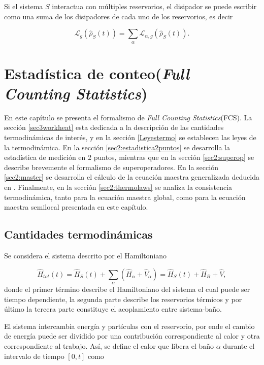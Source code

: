 Si el sistema $S$ interactua con múltiples reservorios, el disipador se puede escribir como una suma de los disipadores de cada uno de los reservorios, es decir

\begin{equation*}
    \mathcal{L}_{g}(\hat{\rho}_{S}(t)) = \sum_{\alpha}\mathcal{L}_{\alpha,g}(\hat{\rho}_{S}(t)).
\end{equation*}

\label{sec:lindblad}


\chapter{Estadística de conteo(\textit{Full Counting Statistics}) }
En este capítulo se presenta el formalismo de \textit{Full Counting Statistics}(FCS). La sección \ref{sec3workheat} esta dedicada a la  descripción de las cantidades termodinámicas de interés, y en la sección \ref{Leyestermo} se establecen las leyes de la termodinámica. En la sección \ref{sec2:estadistica2puntos} se desarrolla la estadística de medición en 2 puntos, mientras que en la sección \ref{sec2:superop} se describe brevemente el formalismo de superoperadores. En la sección \ref{sec2:master} se desarrolla el cálculo de la ecuación maestra generalizada deducida en \cite{potts2021thermodynamically}. Finalmente, en la sección \ref{sec2:thermolaws} se analiza la consistencia termodinámica, tanto para la ecuación maestra global, como para la ecuación maestra semilocal presentada en este capítulo. 

\section{Cantidades termodinámicas}
Se considera el sistema descrito por el Hamiltoniano

\begin{equation*}
    \hat{H}_{tot}(t) = \hat{H}_{S}(t) + \sum_{\alpha}(\hat{H}_{\alpha} + \hat{V}_{\alpha})  = \hat{H}_{S}(t) + \hat{H}_{B} + \hat{V},
\end{equation*}
donde el primer término describe el Hamiltoniano del sistema el cual puede ser tiempo dependiente, la segunda parte describe los reservorios térmicos y por último la tercera parte constituye el acoplamiento entre sistema-baño.

El sistema intercambia energía y partículas con el reservorio, por ende el cambio de energía puede ser dividido por una contribución correspondiente al calor y otra correspondiente al trabajo. Así, se define el calor que libera el baño $\alpha$ durante el intervalo de tiempo $[0,t]$ como

